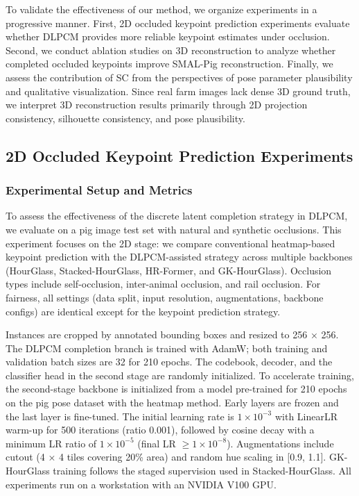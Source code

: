 \documentclass[computers,article,submit,pdftex,moreauthors]{mdpi}
\begin{document}
To validate the effectiveness of our method, we organize experiments in a progressive manner. First, 2D occluded keypoint prediction experiments evaluate whether DLPCM provides more reliable keypoint estimates under occlusion. Second, we conduct ablation studies on 3D reconstruction to analyze whether completed occluded keypoints improve SMAL-Pig reconstruction. Finally, we assess the contribution of SC from the perspectives of pose parameter plausibility and qualitative visualization. Since real farm images lack dense 3D ground truth, we interpret 3D reconstruction results primarily through 2D projection consistency, silhouette consistency, and pose plausibility.

\subsection{2D Occluded Keypoint Prediction Experiments}\label{sec:2d_keypoint}

\subsubsection{Experimental Setup and Metrics}\label{sec:2d_setup}

To assess the effectiveness of the discrete latent completion strategy in DLPCM, we evaluate on a pig image test set with natural and synthetic occlusions. This experiment focuses on the 2D stage: we compare conventional heatmap-based keypoint prediction with the DLPCM-assisted strategy across multiple backbones (HourGlass, Stacked-HourGlass, HR-Former, and GK-HourGlass). Occlusion types include self-occlusion, inter-animal occlusion, and rail occlusion. For fairness, all settings (data split, input resolution, augmentations, backbone configs) are identical except for the keypoint prediction strategy.

Instances are cropped by annotated bounding boxes and resized to 256 × 256. The DLPCM completion branch is trained with AdamW; both training and validation batch sizes are 32 for 210 epochs. The codebook, decoder, and the classifier head in the second stage are randomly initialized. To accelerate training, the second-stage backbone is initialized from a model pre-trained for 210 epochs on the pig pose dataset with the heatmap method. Early layers are frozen and the last layer is fine-tuned. The initial learning rate is $1 \times 10^{-3}$ with LinearLR warm-up for 500 iterations (ratio 0.001), followed by cosine decay with a minimum LR ratio of $1 \times 10^{-5}$ (final LR $\geq 1 \times 10^{-8}$). Augmentations include cutout (4 × 4 tiles covering 20\% area) and random hue scaling in [0.9, 1.1]. GK-HourGlass training follows the staged supervision used in Stacked-HourGlass. All experiments run on a workstation with an NVIDIA V100 GPU.
\end{document}
